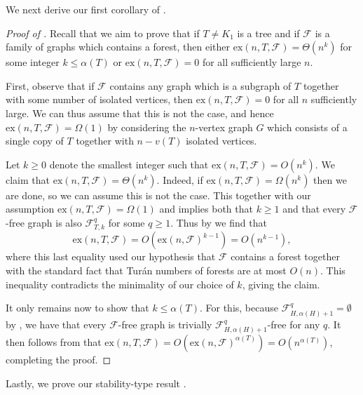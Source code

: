 \documentclass[12pt,letterpaper]{article}
\theoremstyle{definition}
\newcommand{\ex}{\mathrm{ex}}
\renewcommand{\c}[1]{\mathcal{#1}}
\newcommand{\Om}{\Omega}
\newcommand{\al}{\alpha}
\begin{document}
	We next derive our first corollary of . 
	\begin{proof}[Proof of ]
		Recall that we aim to prove that if $T\ne K_1$ is a tree and if $\c{F}$ is a family of graphs which contains a forest, then either $\ex(n,T,\c{F})=\Theta(n^k)$ for some integer $k\le \al(T)$ or $\ex(n,T,\c{F})=0$ for all sufficiently large $n$.
		
		First, observe that if $\c{F}$ contains any graph which is a subgraph of $T$ together with some number of isolated vertices, then $\ex(n,T,\c{F})=0$ for all $n$ sufficiently large.  We can thus assume that this is not the case, and hence $\ex(n,T,\c{F})=\Om(1)$ by considering the $n$-vertex graph $G$ which consists of a single copy of $T$ together with $n-v(T)$ isolated vertices.
		
		Let $k\ge 0$ denote the smallest integer such that $\ex(n,T,\c{F})=O(n^k)$.  We claim that $\ex(n,T,\c{F})=\Theta(n^k)$.  Indeed, if $\ex(n,T,\c{F})=\Om(n^k)$ then we are done, so we can assume this is not the case.  This together with our assumption $\ex(n,T,\c{F})=\Om(1)$ and  implies both that $k\ge 1$ and that every $\c{F}$-free graph is also $\c{F}_{T,k}^q$ for some $q\ge 1$. Thus by   we find that
		\[\ex(n,T,\c{F})=O(\ex(n,\c{F})^{k-1})=O(n^{k-1}),\]
		where this last equality used our hypothesis that $\c{F}$ contains a forest together with the standard fact that Tur\'an numbers of forests are at most $O(n)$.  This inequality contradicts the minimality of our choice of $k$, giving the claim.
		
		It only remains now to show that $k\le \alpha(T)$.  For this, because $\c{F}_{H,\alpha(H)+1}^q=\emptyset$ by , we have that every $\c{F}$-free graph is trivially $\c{F}_{H,\alpha(H)+1}^q$-free for any $q$.  It then follows from  that $\ex(n,T,\c{F})=O(\ex(n,\c{F})^{\alpha(T)})=O(n^{\alpha(T)})$, completing the proof.
		
	\end{proof}
	
	Lastly, we prove our stability-type result .
	
\end{document}
